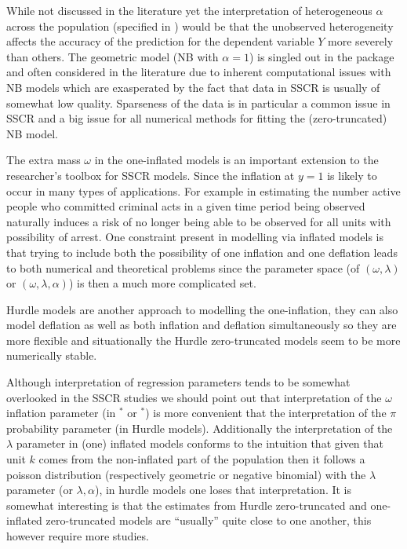 \documentclass[
]{jss}
\newcommand{\1}{\mathcal{I}} \newcommand{\bZero}{\boldsymbol{0}}
\begin{document}
While not discussed in the literature yet the interpretation of
heterogeneous \(\alpha\) across the population (specified in
) would be that the unobserved heterogeneity affects
the accuracy of the prediction for the dependent variable \(Y\) more
severely than others. The geometric model (NB with \(\alpha=1\)) is
singled out in the package and often considered in the literature due to
inherent computational issues with NB models which are exasperated by
the fact that data in SSCR is usually of somewhat low quality.
Sparseness of the data is in particular a common issue in SSCR and a big
issue for all numerical methods for fitting the (zero-truncated) NB
model.

The extra mass \(\omega\) in the one-inflated models is an important
extension to the researcher's toolbox for SSCR models. Since the
inflation at \(y=1\) is likely to occur in many types of applications.
For example in estimating the number active people who committed
criminal acts in a given time period being observed naturally induces a
risk of no longer being able to be observed for all units with
possibility of arrest. One constraint present in modelling via inflated
models is that trying to include both the possibility of one inflation
and one deflation leads to both numerical and theoretical problems since
the parameter space (of \((\omega, \lambda)\) or
\((\omega, \lambda, \alpha)\)) is then a much more complicated set.

Hurdle models are another approach to modelling the one-inflation, they
can also model deflation as well as both inflation and deflation
simultaneously so they are more flexible and situationally the Hurdle
zero-truncated models seem to be more numerically stable.

Although interpretation of regression parameters tends to be somewhat
overlooked in the SSCR studies we should point out that interpretation
of the \(\omega\) inflation parameter (in \(^\ast\) or
\(^\ast\)) is more convenient that the interpretation of the
\(\pi\) probability parameter (in Hurdle models). Additionally the
interpretation of the \(\lambda\) parameter in (one) inflated models
conforms to the intuition that given that unit \(k\) comes from the
non-inflated part of the population then it follows a poisson
distribution (respectively geometric or negative binomial) with the
\(\lambda\) parameter (or \(\lambda,\alpha\)), in hurdle models one
loses that interpretation. It is somewhat interesting is that the
estimates from Hurdle zero-truncated and one-inflated zero-truncated
models are ``usually'' quite close to one another, this however require
more studies.
\end{document}
